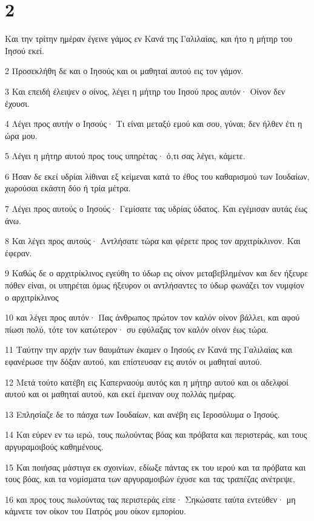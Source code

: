 \chapter{2}

\par Και την τρίτην ημέραν έγεινε γάμος εν Κανά της Γαλιλαίας, και ήτο η μήτηρ του Ιησού εκεί.
\par 2 Προσεκλήθη δε και ο Ιησούς και οι μαθηταί αυτού εις τον γάμον.
\par 3 Και επειδή έλειψεν ο οίνος, λέγει η μήτηρ του Ιησού προς αυτόν· Οίνον δεν έχουσι.
\par 4 Λέγει προς αυτήν ο Ιησούς· Τι είναι μεταξύ εμού και σου, γύναι; δεν ήλθεν έτι η ώρα μου.
\par 5 Λέγει η μήτηρ αυτού προς τους υπηρέτας· ό,τι σας λέγει, κάμετε.
\par 6 Ήσαν δε εκεί υδρίαι λίθιναι εξ κείμεναι κατά το έθος του καθαρισμού των Ιουδαίων, χωρούσαι εκάστη δύο ή τρία μέτρα.
\par 7 Λέγει προς αυτούς ο Ιησούς· Γεμίσατε τας υδρίας ύδατος. Και εγέμισαν αυτάς έως άνω.
\par 8 Και λέγει προς αυτούς· Αντλήσατε τώρα και φέρετε προς τον αρχιτρίκλινον. Και έφεραν.
\par 9 Καθώς δε ο αρχιτρίκλινος εγεύθη το ύδωρ εις οίνον μεταβεβλημένον και δεν ήξευρε πόθεν είναι, οι υπηρέται όμως ήξευρον οι αντλήσαντες το ύδωρ φωνάζει τον νυμφίον ο αρχιτρίκλινος
\par 10 και λέγει προς αυτόν· Πας άνθρωπος πρώτον τον καλόν οίνον βάλλει, και αφού πίωσι πολύ, τότε τον κατώτερον· συ εφύλαξας τον καλόν οίνον έως τώρα.
\par 11 Ταύτην την αρχήν των θαυμάτων έκαμεν ο Ιησούς εν Κανά της Γαλιλαίας και εφανέρωσε την δόξαν αυτού, και επίστευσαν εις αυτόν οι μαθηταί αυτού.
\par 12 Μετά τούτο κατέβη εις Καπερναούμ αυτός και η μήτηρ αυτού και οι αδελφοί αυτού και οι μαθηταί αυτού, και εκεί έμειναν ουχ πολλάς ημέρας.
\par 13 Επλησίαζε δε το πάσχα των Ιουδαίων, και ανέβη εις Ιεροσόλυμα ο Ιησούς.
\par 14 Και εύρεν εν τω ιερώ, τους πωλούντας βόας και πρόβατα και περιστεράς, και τους αργυραμοιβούς καθημένους.
\par 15 Και ποιήσας μάστιγα εκ σχοινίων, εδίωξε πάντας εκ του ιερού και τα πρόβατα και τους βόας, και τα νομίσματα των αργυραμοιβών έχυσε και τας τραπέζας ανέτρεψε,
\par 16 και προς τους πωλούντας τας περιστεράς είπε· Σηκώσατε ταύτα εντεύθεν· μη κάμνετε τον οίκον του Πατρός μου οίκον εμπορίου.
